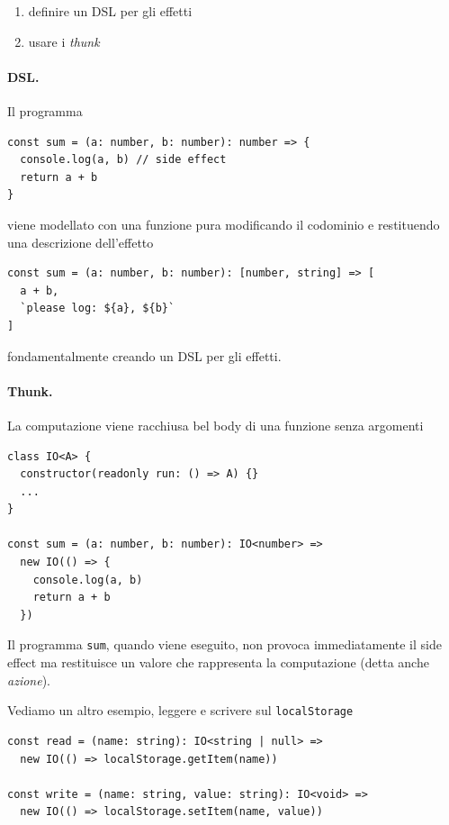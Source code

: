 \documentclass[12pt]{article}
\begin{document}
\begin{enumerate}
  \item definire un DSL per gli effetti
  \item usare i \emph{thunk}
\end{enumerate}

\paragraph{DSL.} Il programma

\begin{verbatim}
const sum = (a: number, b: number): number => {
  console.log(a, b) // side effect
  return a + b
}
\end{verbatim}

viene modellato con una funzione pura modificando il codominio e restituendo una descrizione dell'effetto

\begin{verbatim}
const sum = (a: number, b: number): [number, string] => [
  a + b,
  `please log: ${a}, ${b}`
]
\end{verbatim}

fondamentalmente creando un DSL per gli effetti.

\paragraph{Thunk.} La computazione viene racchiusa bel body di una funzione senza argomenti

\begin{verbatim}
class IO<A> {
  constructor(readonly run: () => A) {}
  ...
}

const sum = (a: number, b: number): IO<number> =>
  new IO(() => {
    console.log(a, b)
    return a + b
  })
\end{verbatim}

Il programma \texttt{sum}, quando viene eseguito, non provoca immediatamente il side effect ma restituisce un valore che rappresenta
la computazione (detta anche \emph{azione}).

Vediamo un altro esempio, leggere e scrivere sul \texttt{localStorage}

\begin{verbatim}
const read = (name: string): IO<string | null> =>
  new IO(() => localStorage.getItem(name))

const write = (name: string, value: string): IO<void> =>
  new IO(() => localStorage.setItem(name, value))
\end{verbatim}
\end{document}
